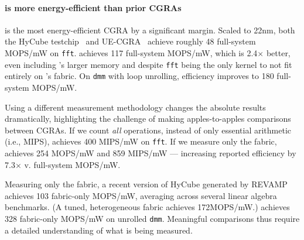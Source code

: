 \paragraph{\riptide is more energy-efficient than prior CGRAs}
\riptide is the most energy-efficient CGRA by a significant margin.
% 
Scaled to 22nm,
both the HyCube testchip~\cite{wang2019hycube} and
UE-CGRA~\cite{torng_pan_2021} achieve roughly 48 full-system MOPS/mW on {\tt fft}.
%
% 
\riptide achieves 117 full-system MOPS/mW,
which is 2.4$\times$ better,
%
even including \riptide's larger memory and
despite {\tt fft} being the only kernel to not fit entirely on \riptide's fabric.
%
On {\tt dmm} with loop unrolling,
efficiency improves to 180 full-system MOPS/mW.
% 
% 

Using a different measurement methodology changes the absolute results dramatically,
highlighting the challenge of making apples-to-apples comparisons between CGRAs.
%
If we count {\em all} operations, instead of only essential arithmetic (i.e., MIPS),
\riptide achieves 400 MIPS/mW on {\tt fft}.
%
If we measure only the fabric, \riptide achieves 254 MOPS/mW
and 859 MIPS/mW --- increasing reported efficiency by 7.3$\times$ v. full-system MOPS/mW.

Measuring only the fabric,
a recent version of HyCube generated by REVAMP~\cite{revamp}
achieves 103 fabric-only MOPS/mW,
averaging across several linear
algebra benchmarks.
%
(A tuned, heterogeneous fabric achieves 172MOPS/mW.)
%
\riptide achieves 328 fabric-only MOPS/mW on unrolled {\tt dmm}.
%
Meaningful comparisons thus require a detailed understanding
of what is being measured.

